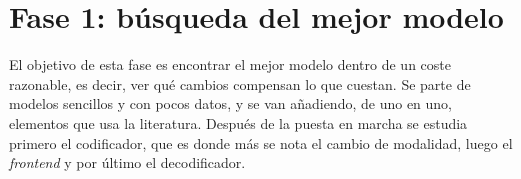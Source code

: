 \section{Fase 1: búsqueda del mejor modelo}
\label{sec:fase1}

El objetivo de esta fase es encontrar el mejor modelo dentro de un coste razonable, es decir, ver qué cambios compensan lo que cuestan. Se parte de modelos sencillos y con pocos datos, y se van añadiendo, de uno en uno, elementos que usa la literatura. Después de la puesta en marcha se estudia primero el codificador, que es donde más se nota el cambio de modalidad, luego el \textit{frontend} y por último el decodificador.




